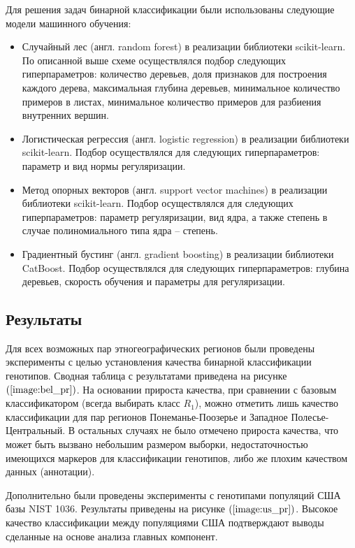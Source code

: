 Для решения задач бинарной классификации были использованы следующие модели машинного обучения:
\begin{itemize}
\item Случайный лес (англ. random forest) в реализации библиотеки scikit-learn.
По описанной выше схеме осуществлялся подбор следующих гиперпараметров: количество деревьев, доля признаков
для построения каждого дерева, максимальная глубина деревьев, минимальное количество примеров в листах,
минимальное количество примеров для разбиения внутренних вершин.

\item Логистическая регрессия (англ. logistic regression) в реализации библиотеки scikit-learn.
Подбор осуществлялся для следующих гиперпараметров: параметр и вид нормы регуляризации.

\item Метод опорных векторов (англ. support vector machines) в реализации библиотеки scikit-learn.
Подбор осуществлялся для следующих гиперпараметров: параметр регуляризации, вид ядра, а также степень
в случае полиномиального типа ядра -- степень.


\item Градиентный бустинг (англ. gradient boosting) в реализации библиотеки CatBoost.
Подбор осуществлялся для следующих гиперпараметров: глубина деревьев, скорость обучения и
параметры для регуляризации.
\end{itemize}

\subsection{Результаты}

Для всех возможных пар этногеографических регионов были проведены эксперименты с целью установления
качества бинарной классификации генотипов. Сводная таблица с результатами приведена на рисунке
$\left(\ref{image:bel_pr}\right)$. На основании прироста качества, при сравнении с базовым классификатором (всегда выбирать класс $R_{1}$),
можно отметить лишь качество классификации для пар регионов Понеманье-Поозерье и Западное Полесье-Центральный.
В остальных случаях не было отмечено прироста качества, что может быть вызвано небольшим размером выборки,
недостаточностью имеющихся маркеров для классификации генотипов, либо же плохим качеством данных (аннотации).

Дополнительно были проведены эксперименты с генотипами популяций США базы NIST 1036.
Результаты приведены на рисунке $\left(\ref{image:us_pr}\right)$. Высокое качество
классификации между популяциями США подтверждают выводы сделанные на основе анализа
главных компонент.

